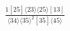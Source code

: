 \documentclass[varwidth, border=5pt]{standalone}
\begin{document}
\begin{my}
$\begin{gathered}
\scriptscriptstyle\frac{1[25]⟨23⟩⟨25⟩[13]}{⟨34⟩⟨35⟩^2[35]⟨45⟩}
\end{gathered}$
\end{my}
\end{document}

